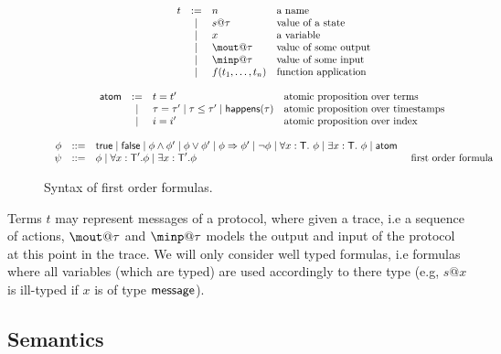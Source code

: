 \documentclass[a4paper]{article}
\theoremstyle{remark}
\begin{document}
\begin{figure}
\[\begin{array}{c}
\begin{array}{rcll}
    t & := & n &\text{a name } \\
           & \mid & s@\tau &\text{value of a state}\\
    & \mid & x  & \text{a variable} \\
    & \mid & \mout@\tau & \text{value of some output} \\
    & \mid & \minp@\tau & \text{value of some input} \\
    & \mid & f(t_1,\dots,t_n) &\text{function application}\\
       \end{array}
\\
\\
   \begin{array}{rcll}
   \atom & := & t=t'
 & \text{atomic proposition over terms } \\
  &\mid & \tau=\tau' \mid \tau \leq \tau' \mid \happens(\tau) &  \text{atomic proposition
  over timestamps } \\
  &\mid & i=i'  &  \text{atomic proposition
    over index } \\
    \end{array}
\\
\\
     \begin{array}{rcll}
    \phi & ::= &  \true \mid \false \mid \phi \wedge \phi' \mid  \phi
    \vee \phi' \mid   \phi \Rightarrow \phi'\mid \neg \phi \mid
    \forall x : \T.\ \phi \mid \exists x:\T.\ \phi \mid \atom &
\\
    \psi & ::= &  \phi \mid \forall x : \T'. \phi \mid \exists x : \T'. \phi &
    \text{
    first order formula} \\
    \end{array}

\end{array}
    \]
    \caption{Syntax of first order formulas.}\label{fig:syntax}
\end{figure}


Terms $t$ may represent messages of a protocol, where given a trace,
i.e a sequence of actions, $\mout@\tau$ and
$\minp@\tau$ models the output and input of the protocol at this
point in the trace. We will only consider well typed formulas, i.e
formulas where all variables (which are typed) are used accordingly
to there type (e.g, $s@x$ is ill-typed if $x$ is of type $\textsf{message}$).

\subsection{Semantics}
\end{document}
